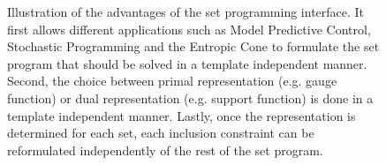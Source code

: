 \documentclass[11pt,twoside,a4paper,openright]{uclouvain-thesis}
\begin{document}
\begin{figure}
  \centering

  \caption{
    Illustration of the advantages of the set programming interface.
    It first allows different applications such as Model Predictive Control,
    Stochastic Programming and the Entropic Cone to formulate the set
    program that should be solved in a template independent manner.
    Second, the choice between primal representation (e.g. gauge function)
    or dual representation (e.g. support function) is done in a template independent manner.
    Lastly, once the representation is determined for each set, each inclusion constraint
    can be reformulated independently of the rest of the set program.
  }
  \label{fig:setprog}
\end{figure}
\end{document}
